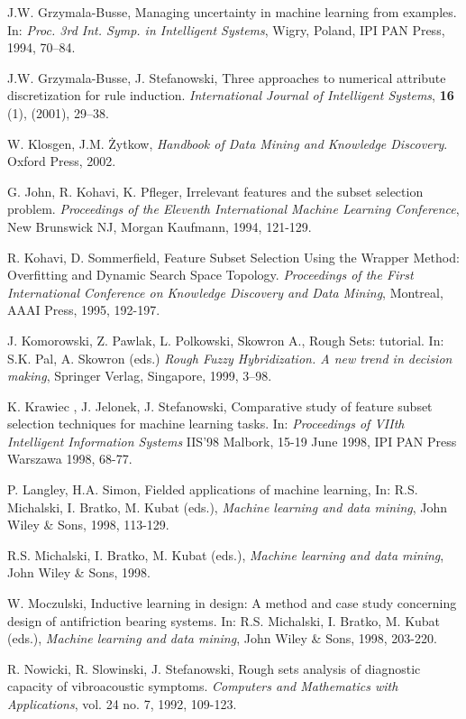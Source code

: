 \documentclass{elsart}
\begin{document}
\begin{thebibliography}{17}
 J.W. Grzymala-Busse,   Managing uncertainty in machine
learning from examples. In: {\em Proc. 3rd Int. Symp. in
Intelligent Systems}, Wigry, Poland, IPI PAN Press, 1994, 70--84.

 J.W. Grzymala-Busse,  J. Stefanowski,
Three approaches to numerical attribute discretization for rule
induction. {\em International Journal of Intelligent Systems},
{\bf 16} (1), (2001), 29--38.

 W. Klosgen, J.M. \.Zytkow, {\em Handbook of Data Mining and Knowledge
Discovery}. Oxford Press, 2002.


 G. John, R. Kohavi, K. Pfleger, Irrelevant features and the subset
selection problem. {\em Proceedings of the Eleventh International
Machine Learning Conference}, New Brunswick NJ, Morgan Kaufmann,
1994, 121-129.


  R. Kohavi, D. Sommerfield, Feature Subset Selection Using
the Wrapper Method: Overfitting and Dynamic Search Space Topology.
{\em Proceedings of the First International Conference on
Knowledge Discovery and Data Mining}, Montreal, AAAI Press, 1995,
192-197.

  J. Komorowski, Z. Pawlak, L. Polkowski, Skowron A., Rough
Sets: tutorial. In: S.K. Pal, A. Skowron (eds.) {\em Rough Fuzzy
Hybridization. A new trend in decision making}, Springer Verlag, Singapore,
1999, 3--98.

  K. Krawiec ,  J. Jelonek, J. Stefanowski, Comparative
study of feature subset selection techniques for machine learning tasks. In:
{\em Proceedings of VIIth Intelligent Information Systems} IIS'98 Malbork,
15-19 June 1998, IPI PAN Press Warszawa 1998, 68-77.


 P. Langley, H.A. Simon, Fielded applications of
machine learning, In: R.S. Michalski, I. Bratko,  M. Kubat (eds.),
{\em Machine learning and data mining}, John Wiley \& Sons, 1998,
113-129.


 R.S. Michalski, I. Bratko,  M. Kubat (eds.),
{\em Machine learning and data mining}, John Wiley \& Sons, 1998.

 W. Moczulski, Inductive learning in design: A method and case
study concerning design of antifriction bearing systems. In: R.S.
Michalski, I. Bratko,  M. Kubat (eds.), {\em Machine learning and
data mining}, John Wiley \& Sons, 1998, 203-220.

 R. Nowicki, R. Slowinski, J. Stefanowski, Rough sets analysis
of diagnostic capacity of vibroacoustic symptoms. {\em Computers and
 Mathematics with Applications}, vol. 24 no. 7,  1992,   109-123.



\end{thebibliography}
\end{document}
